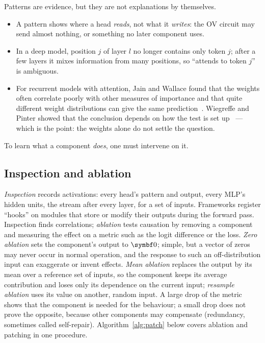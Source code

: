 \documentclass[11pt]{article}
\begin{document}
Patterns are evidence, but they are not explanations by themselves.
\begin{itemize}
\item A pattern shows where a head \emph{reads}, not what it \emph{writes}: the OV circuit may send almost nothing, or
  something no later component uses.
\item In a deep model, position $j$ of layer $l$ no longer contains only token $j$; after a few layers it mixes information
  from many positions, so ``attends to token $j$'' is ambiguous.
\item For recurrent models with attention, Jain and Wallace found that the weights often correlate poorly with other
  measures of importance and that quite different weight distributions can give the same prediction~\cite{jain2019}.
  Wiegreffe and Pinter showed that the conclusion depends on how the test is set up~\cite{wiegreffe2019} --- which is the
  point: the weights alone do not settle the question.
\end{itemize}
To learn what a component \emph{does}, one must intervene on it.

\subsection{Inspection and ablation}\label{sec:ablation}

\emph{Inspection} records activations: every head's pattern and output, every MLP's hidden units, the stream after every
layer, for a set of inputs. Frameworks register ``hooks'' on modules that store or modify their outputs during the forward
pass. Inspection finds correlations; \emph{ablation} tests causation by removing a component and measuring the effect on a
metric such as the logit difference or the loss.
\emph{Zero ablation} sets the component's output to $\vect{0}$; simple, but a vector of zeros may never occur in normal
operation, and the response to such an off-distribution input can exaggerate or invent effects. \emph{Mean ablation}
replaces the output by its mean over a reference set of inputs, so the component keeps its average contribution and loses
only its dependence on the current input; \emph{resample ablation} uses its value on another, random input. A large drop of the metric shows that the component is needed for the behaviour; a small drop does not prove the opposite,
because other components may compensate (redundancy, sometimes called self-repair). Algorithm~\ref{alg:patch} below
covers ablation and patching in one procedure.
\end{document}
